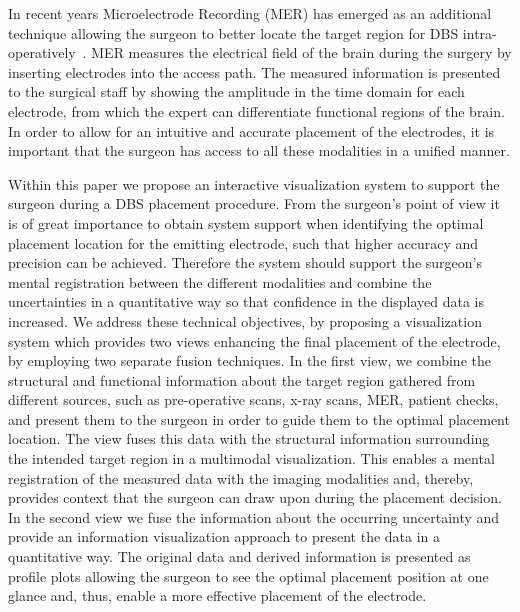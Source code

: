 \documentclass{vgtc}                          %
\begin{document}
In recent years Microelectrode Recording (MER) has emerged as an additional technique allowing the surgeon to better locate the target region for DBS intra-operatively~\cite{Lenz1988}. MER measures the electrical field of the brain during the surgery by inserting electrodes into the access path. The measured information is presented to the surgical staff by showing the amplitude in the time domain for each electrode, from which the expert can differentiate functional regions of the brain. In order to allow for an intuitive and accurate placement of the electrodes, it is important that the surgeon has access to all these modalities in a unified manner.

Within this paper we propose an interactive visualization system to support the surgeon during a DBS placement procedure. From the surgeon's point of view it is of great importance to obtain system support when identifying the optimal placement location for the emitting electrode, such that higher accuracy and precision can be achieved. Therefore the system should support the surgeon's mental registration between the different modalities and combine the uncertainties in a quantitative way so that confidence in the displayed data is increased.%
%
We address these technical objectives, by proposing a visualization system which provides two views enhancing the final placement of the electrode, by employing two separate fusion techniques. In the first view, we combine the structural and functional information about the target region gathered from different sources, such as pre-operative scans, x-ray scans, MER, patient checks, and present them to the surgeon in order to guide them to the optimal placement location. The view fuses this data with the structural information surrounding the intended target region in a multimodal visualization. This enables a mental registration of the measured data with the imaging modalities and, thereby, provides context that the surgeon can draw upon during the placement decision. In the second view we fuse the information about the occurring uncertainty and provide an information visualization approach to present the data in a quantitative way. The original data and derived information is presented as profile plots allowing the surgeon to see the optimal placement position at one glance and, thus, enable a more effective placement of the electrode.
\end{document}
